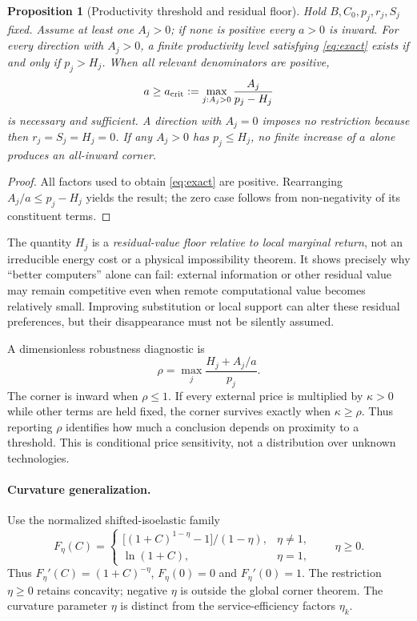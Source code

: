 \documentclass[11pt,a4paper]{article}
\newtheorem{proposition}{Proposition}
\theoremstyle{definition}\newtheorem{definition}{Definition}
\begin{document}
\begin{proposition}[Productivity threshold and residual floor]
\label{prop:threshold}
Hold $B,C_0,p_j,r_j,S_j$ fixed. Assume at least one $A_j>0$; if none is positive every $a>0$ is inward. For every direction with $A_j>0$, a finite productivity level satisfying \cref{eq:exact} exists if and only if $p_j>H_j$. When all relevant denominators are positive,
\begin{equation}
 a\geq a_{\rm crit}:=\max_{j:A_j>0}\frac{A_j}{p_j-H_j}
 \label{eq:acrit}
\end{equation}
is necessary and sufficient. A direction with $A_j=0$ imposes no restriction because then $r_j=S_j=H_j=0$. If any $A_j>0$ has $p_j\leq H_j$, no finite increase of $a$ alone produces an all-inward corner.
\end{proposition}
\begin{proof}
All factors used to obtain \cref{eq:exact} are positive. Rearranging $A_j/a\leq p_j-H_j$ yields the result; the zero case follows from non-negativity of its constituent terms.
\end{proof}

The quantity $H_j$ is a \emph{residual-value floor relative to local marginal return}, not an irreducible energy cost or a physical impossibility theorem. It shows precisely why ``better computers'' alone can fail: external information or other residual value may remain competitive even when remote computational value becomes relatively small. Improving substitution or local support can alter these residual preferences, but their disappearance must not be silently assumed.

A dimensionless robustness diagnostic is
\begin{equation}
 \rho=\max_j\frac{H_j+A_j/a}{p_j}.
 \label{eq:rho}
\end{equation}
The corner is inward when $\rho\leq1$. If every external price is multiplied by $\kappa>0$ while other terms are held fixed, the corner survives exactly when $\kappa\geq\rho$. Thus reporting $\rho$ identifies how much a conclusion depends on proximity to a threshold. This is conditional price sensitivity, not a distribution over unknown technologies.

\paragraph{Curvature generalization.}

Use the normalized shifted-isoelastic family
\begin{equation}
 F_\eta(C)=
 \begin{cases}
 \big[(1+C)^{1-\eta}-1\big]/(1-\eta),&\eta\neq1,\\
 \ln(1+C),&\eta=1,
 \end{cases}
 \qquad \eta\geq0.
 \label{eq:isoelastic}
\end{equation}
Thus $F_\eta'(C)=(1+C)^{-\eta}$, $F_\eta(0)=0$ and
$F_\eta'(0)=1$. The restriction $\eta\geq0$ retains concavity;
negative $\eta$ is outside the global corner theorem. The curvature
parameter $\eta$ is distinct from the service-efficiency factors $\eta_k$.
\end{document}
